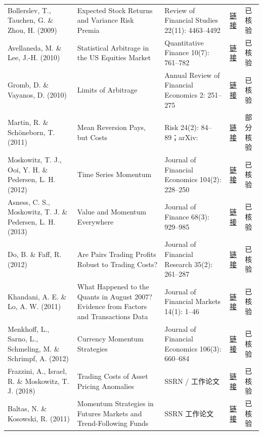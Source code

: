 \begin{longtable}{@{}>{\raggedright\arraybackslash}p{2.55cm}>{\raggedright\arraybackslash}p{4.7cm}>{\raggedright\arraybackslash}p{2.7cm}>{\raggedright\arraybackslash}p{1.9cm}>{\raggedright\arraybackslash}p{1.45cm}@{}}
Bollerslev, T., Tauchen, G. \& Zhou, H. (2009) & Expected Stock Returns and Variance Risk Premia & Review of Financial Studies 22(11): 4463--4492 & \href{https://doi.org/10.1093/rfs/hhp008}{链接} & 已核验 \\
Avellaneda, M. \& Lee, J.-H. (2010) & Statistical Arbitrage in the US Equities Market & Quantitative Finance 10(7): 761--782 & \href{https://doi.org/10.1080/14697680903124632}{链接} & 已核验 \\
Gromb, D. \& Vayanos, D. (2010) & Limits of Arbitrage & Annual Review of Financial Economics 2: 251--275 & \href{https://doi.org/10.1146/annurev-financial-073009-104107}{链接} & 已核验 \\
Martin, R. \& Schöneborn, T. (2011) & Mean Reversion Pays, but Costs & Risk 24(2): 84--89；arXiv:\allowbreak 1103.4934 & \href{https://arxiv.org/abs/1103.4934}{链接} & 部分核验 \\
Moskowitz, T. J., Ooi, Y. H. \& Pedersen, L. H. (2012) & Time Series Momentum & Journal of Financial Economics 104(2): 228--250 & \href{https://doi.org/10.1016/j.jfineco.2011.11.003}{链接} & 已核验 \\
Asness, C. S., Moskowitz, T. J. \& Pedersen, L. H. (2013) & Value and Momentum Everywhere & Journal of Finance 68(3): 929--985 & \href{https://doi.org/10.1111/jofi.12021}{链接} & 已核验 \\
Do, B. \& Faff, R. (2012) & Are Pairs Trading Profits Robust to Trading Costs? & Journal of Financial Research 35(2): 261--287 & \href{https://doi.org/10.1111/j.1475-6803.2012.01317.x}{链接} & 已核验 \\
Khandani, A. E. \& Lo, A. W. (2011) & What Happened to the Quants in August 2007? Evidence from Factors and Transactions Data & Journal of Financial Markets 14(1): 1--46 & \href{https://doi.org/10.1016/j.finmar.2010.07.005}{链接} & 已核验 \\
Menkhoff, L., Sarno, L., Schmeling, M. \& Schrimpf, A. (2012) & Currency Momentum Strategies & Journal of Financial Economics 106(3): 660--684 & \href{https://doi.org/10.1016/j.jfineco.2012.06.009}{链接} & 已核验 \\
Frazzini, A., Israel, R. \& Moskowitz, T. J. (2018) & Trading Costs of Asset Pricing Anomalies & SSRN / 工作论文 & \href{https://doi.org/10.2139/ssrn.2294498}{链接} & 已核验 \\
Baltas, N. \& Kosowski, R. (2011) & Momentum Strategies in Futures Markets and Trend-Following Funds & SSRN 工作论文 & \href{https://doi.org/10.2139/ssrn.1968996}{链接} & 已核验 \\

\end{longtable}
